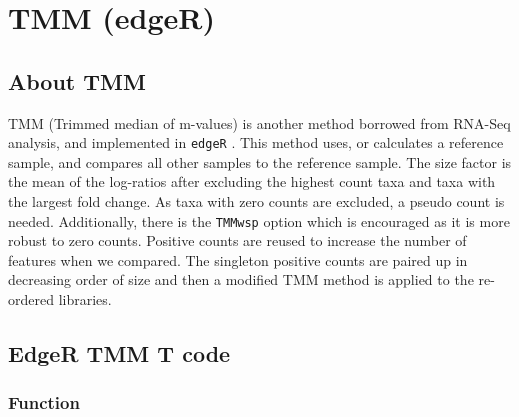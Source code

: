 \documentclass[
]{book}
\begin{document}
\hypertarget{tmm-edger}{%
\section{TMM (edgeR)}\label{tmm-edger}}

\hypertarget{about-tmm}{%
\subsection{About TMM}\label{about-tmm}}

TMM (Trimmed median of m-values) is another method borrowed from RNA-Seq analysis, and implemented in \texttt{edgeR} \citep{robinson2010}. This method uses, or calculates a reference sample, and compares all other samples to the reference sample. The size factor is the mean of the log-ratios after excluding the highest count taxa and taxa with the largest fold change. As taxa with zero counts are excluded, a pseudo count is needed. Additionally, there is the \texttt{TMMwsp} option which is encouraged as it is more robust to zero counts. Positive counts are reused to increase the number of features when we compared. The singleton positive counts are paired up in decreasing order of size and then a modified TMM method is applied to the re-ordered libraries.

\hypertarget{edger-tmm-t-code}{%
\subsection{EdgeR TMM T code}\label{edger-tmm-t-code}}

\hypertarget{function-4}{%
\subsubsection{Function}\label{function-4}}
\end{document}
